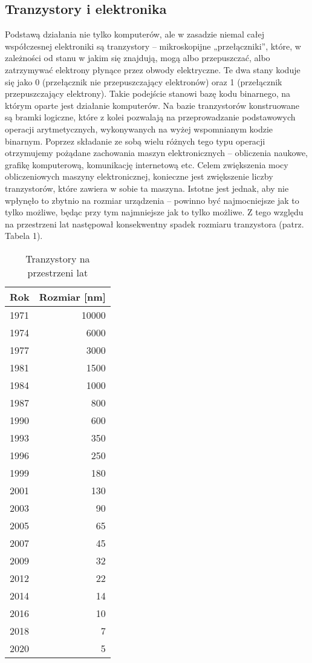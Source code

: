 \documentclass[12pt,a4paper,twoside,openany]{book}
\begin{document}
\subsection{Tranzystory i elektronika}
Podstawą działania nie tylko komputerów, ale w zasadzie niemal całej współczesnej elektroniki są tranzystory – mikroskopijne „przełączniki”, które, w zależności od stanu w jakim się znajdują, mogą albo przepuszczać, albo zatrzymywać elektrony płynące przez obwody elektryczne. Te dwa stany koduje się jako 0 (przełącznik nie przepuszczający elektronów) oraz 1 (przełącznik przepuszczający elektrony). Takie podejście stanowi bazę kodu binarnego, na którym oparte jest działanie komputerów.
Na bazie tranzystorów konstruowane są bramki logiczne, które z kolei pozwalają na przeprowadzanie podstawowych operacji arytmetycznych, wykonywanych na wyżej wspomnianym kodzie binarnym. Poprzez składanie ze sobą wielu różnych tego typu operacji otrzymujemy pożądane zachowania maszyn elektronicznych – obliczenia naukowe, grafikę komputerową, komunikację internetową etc.
	Celem zwiększenia mocy obliczeniowych maszyny elektronicznej, konieczne jest zwiększenie liczby tranzystorów, które zawiera w sobie ta maszyna. Istotne jest jednak, aby nie wpłynęło to zbytnio na rozmiar urządzenia – powinno być najmocniejsze jak to tylko możliwe, będąc przy tym najmniejsze jak to tylko możliwe. Z tego względu na przestrzeni lat następował konsekwentny spadek rozmiaru tranzystora (patrz. Tabela 1).
	


\begin{table}[h]
\centering
\caption{Tranzystory na przestrzeni lat}
\label{tab:przyklad}
\footnotesize
\begin{tabular}{|l|r|}
\hline
Rok & Rozmiar [nm]\\
\hline
1971 & 10000  \\
1974 & 6000  \\
1977 & 3000 \\
1981 & 1500 \\
1984 & 1000 \\
1987 & 800 \\
1990 & 600 \\
1993 & 350 \\
1996 & 250 \\
1999 & 180 \\
2001 & 130 \\
2003 & 90 \\
2005 & 65 \\
2007 & 45 \\
2009 & 32 \\
2012 & 22 \\
2014 & 14 \\
2016 & 10 \\
2018 & 7 \\
2020 & 5 \\

\hline
\end{tabular} 
\end{table}
\end{document}
